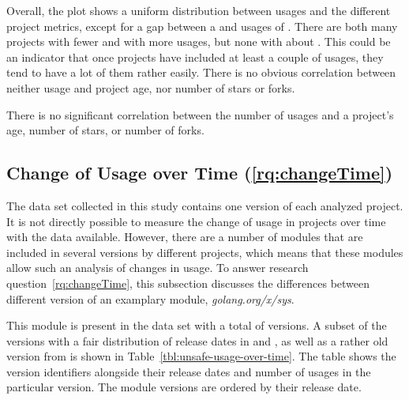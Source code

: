 

Overall, the plot shows a uniform distribution between \unsafe{} usages and the different project metrics, except for
a gap between a  and  usages of \unsafe{}.
There are both many projects with fewer and with more usages, but none with about .
This could be an indicator that once projects have included at least a couple of \unsafe{} usages, they tend to have
a lot of them rather easily.
There is no obvious correlation between neither \unsafe{} usage and project age, nor number of stars or forks.

\begin{answerToRQ}[\ref{rq:popularity}]
    There is no significant correlation between the number of \unsafe{} usages and a project's age, number of stars, or
    number of forks.
\end{answerToRQ}



\subsection{Change of Usage over Time (\ref{rq:changeTime})}\label{subsec:go-geiger:evaluation:over-time}

The data set collected in this study contains one version of each analyzed project.
It is not directly possible to measure the change of \unsafe{} usage in projects over time with the data available.
However, there are a number of modules that are included in several versions by different projects, which means that
these modules allow such an analysis of changes in \unsafe{} usage.
To answer research question~\ref{rq:changeTime}, this subsection discusses the differences between different version of
an examplary module, \textit{golang.org/x/sys}.

This module is present in the data set with a total of \sysModuleVersions{} versions.
A subset of the versions with a fair distribution of release dates in  and , as well as a
rather old version from  is shown in Table~\ref{tbl:unsafe-usage-over-time}.
The table shows the version identifiers alongside their release dates and number of \unsafe{} usages in the particular
version.
The module versions are ordered by their release date.



